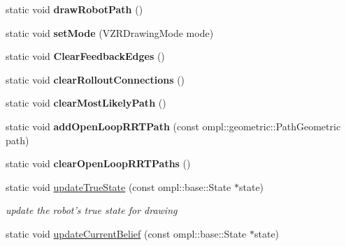 \begin{DoxyCompactItemize}
\item 
\hypertarget{class_visualizer_a918f5598cf7479d190f8d29600fa16d5}{static void {\bfseries draw\-Robot\-Path} ()}\label{class_visualizer_a918f5598cf7479d190f8d29600fa16d5}

\item 
\hypertarget{class_visualizer_a652f193100d7d75a85061d170b6e4a5d}{static void {\bfseries set\-Mode} (V\-Z\-R\-Drawing\-Mode mode)}\label{class_visualizer_a652f193100d7d75a85061d170b6e4a5d}

\item 
\hypertarget{class_visualizer_a7ee82eedc8128237b09d8eefaf421679}{static void {\bfseries Clear\-Feedback\-Edges} ()}\label{class_visualizer_a7ee82eedc8128237b09d8eefaf421679}

\item 
\hypertarget{class_visualizer_ada63070c0f48730528ae11fe6116cb89}{static void {\bfseries clear\-Rollout\-Connections} ()}\label{class_visualizer_ada63070c0f48730528ae11fe6116cb89}

\item 
\hypertarget{class_visualizer_a9f2be28abd54f00462af50b1cac3a135}{static void {\bfseries clear\-Most\-Likely\-Path} ()}\label{class_visualizer_a9f2be28abd54f00462af50b1cac3a135}

\item 
\hypertarget{class_visualizer_afc6c18807bedf44057734905cef8e550}{static void {\bfseries add\-Open\-Loop\-R\-R\-T\-Path} (const ompl\-::geometric\-::\-Path\-Geometric path)}\label{class_visualizer_afc6c18807bedf44057734905cef8e550}

\item 
\hypertarget{class_visualizer_aae26a006f1d085045429c21649d96d8b}{static void {\bfseries clear\-Open\-Loop\-R\-R\-T\-Paths} ()}\label{class_visualizer_aae26a006f1d085045429c21649d96d8b}

\item 
\hypertarget{class_visualizer_a65c3c5451f614eda7d0ed83613ad1ed4}{static void \hyperlink{class_visualizer_a65c3c5451f614eda7d0ed83613ad1ed4}{update\-True\-State} (const ompl\-::base\-::\-State $\ast$state)}\label{class_visualizer_a65c3c5451f614eda7d0ed83613ad1ed4}

\begin{DoxyCompactList}\small\item\em update the robot's true state for drawing \end{DoxyCompactList}\item 
\hypertarget{class_visualizer_a00b248fc1bc0bf1f445d1b72cbaad301}{static void \hyperlink{class_visualizer_a00b248fc1bc0bf1f445d1b72cbaad301}{update\-Current\-Belief} (const ompl\-::base\-::\-State $\ast$state)}\label{class_visualizer_a00b248fc1bc0bf1f445d1b72cbaad301}


\end{DoxyCompactItemize}
